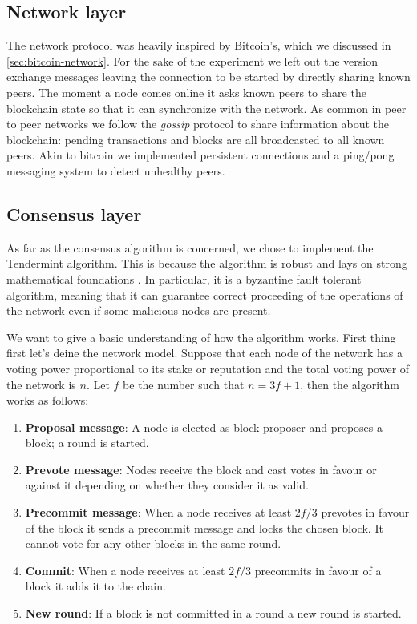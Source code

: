 \subsection{Network layer}
The network protocol was heavily inspired by Bitcoin's, which we discussed in \ref{sec:bitcoin-network}.
For the sake of the experiment we left out the version exchange messages leaving the connection to be started
by directly sharing known peers.
The moment a node comes online it asks known peers to share the blockchain state so that it can synchronize
with the network.
As common in peer to peer networks we follow the \textit{gossip} protocol to share information about the
blockchain: pending transactions and blocks are all broadcasted to all known peers.
Akin to bitcoin we implemented persistent connections and a ping/pong messaging system to detect unhealthy peers.

\subsection{Consensus layer}\label{sec:consensus}
As far as the consensus algorithm is concerned, we chose to implement the Tendermint algorithm.
This is because the algorithm is robust and lays on strong mathematical foundations \cite{Tendermint}.
In particular, it is a byzantine fault tolerant algorithm, meaning that it can guarantee correct proceeding
of the operations of the network even if some malicious nodes are present.

We want to give a basic understanding of how the algorithm works. First thing first let's deine the network model.
Suppose that each node of the network has a voting power proportional to its stake or reputation and the
total voting power of the network is $n$.
Let $f$ be the number such that $n = 3f + 1$, then the algorithm works as follows:

\begin{enumerate}
  \item \textbf{Proposal message}: A node is elected as block proposer and proposes a block; a round is started.
  \item \textbf{Prevote message}: Nodes receive the block and cast votes in favour or against it depending on
    whether they consider it as valid.
  \item \textbf{Precommit message}: When a node receives at least $2f/3$ prevotes in favour of the block it
    sends a precommit message and locks the chosen block.
    It cannot vote for any other blocks in the same round.
  \item \textbf{Commit}: When a node receives at least $2f/3$ precommits in favour of a block it adds it to the chain.
  \item \textbf{New round}: If a block is not committed in a round a new round is started.
\end{enumerate}

